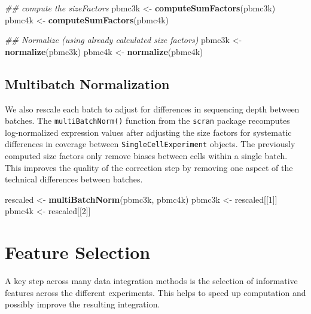 \documentclass[]{book}
\newenvironment{Shaded}{\begin{snugshade}}{\end{snugshade}}
\newcommand{\CommentTok}[1]{\textcolor[rgb]{0.56,0.35,0.01}{\textit{#1}}}
\newcommand{\DecValTok}[1]{\textcolor[rgb]{0.00,0.00,0.81}{#1}}
\newcommand{\KeywordTok}[1]{\textcolor[rgb]{0.13,0.29,0.53}{\textbf{#1}}}
\newcommand{\NormalTok}[1]{#1}
\newcommand{\StringTok}[1]{\textcolor[rgb]{0.31,0.60,0.02}{#1}}
\begin{document}
\begin{Shaded}
\begin{Highlighting}[]
\CommentTok{## compute the sizeFactors}
\NormalTok{pbmc3k <-}\StringTok{ }\KeywordTok{computeSumFactors}\NormalTok{(pbmc3k)}
\NormalTok{pbmc4k <-}\StringTok{ }\KeywordTok{computeSumFactors}\NormalTok{(pbmc4k)}

\CommentTok{## Normalize (using already calculated size factors)}
\NormalTok{pbmc3k <-}\StringTok{ }\KeywordTok{normalize}\NormalTok{(pbmc3k)}
\NormalTok{pbmc4k <-}\StringTok{ }\KeywordTok{normalize}\NormalTok{(pbmc4k)}
\end{Highlighting}
\end{Shaded}

\hypertarget{multibatch-normalization}{%
\subsection{Multibatch Normalization}\label{multibatch-normalization}}

We also rescale each batch to adjust for differences in sequencing depth between batches. The \texttt{multiBatchNorm()} function from the \texttt{scran} package recomputes log-normalized expression values after adjusting the size factors for systematic differences in coverage between \texttt{SingleCellExperiment} objects. The previously computed size factors only remove biases between cells within a single batch. This improves the quality of the correction step by removing one aspect of the technical differences between batches.

\begin{Shaded}
\begin{Highlighting}[]
\NormalTok{rescaled <-}\StringTok{ }\KeywordTok{multiBatchNorm}\NormalTok{(pbmc3k, pbmc4k)}
\NormalTok{pbmc3k <-}\StringTok{ }\NormalTok{rescaled[[}\DecValTok{1}\NormalTok{]]}
\NormalTok{pbmc4k <-}\StringTok{ }\NormalTok{rescaled[[}\DecValTok{2}\NormalTok{]]}
\end{Highlighting}
\end{Shaded}

\hypertarget{feature-selection}{%
\section{Feature Selection}\label{feature-selection}}

A key step across many data integration methods is the selection of informative features across the different experiments. This helps to speed up computation and possibly improve the resulting integration.
\end{document}
